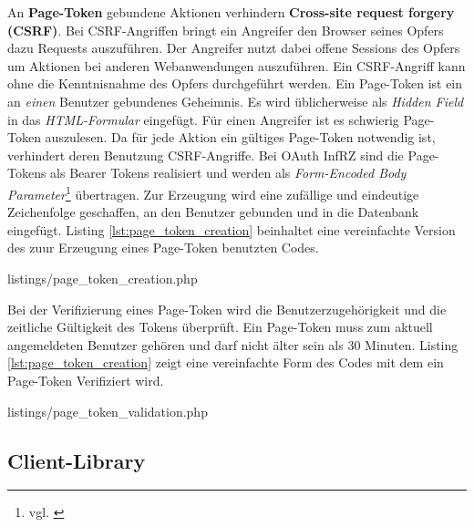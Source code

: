 \documentclass[12pt,a4paper,pointednumbers,abstracton]{scrartcl}
\begin{document}
An \textbf{Page-Token} gebundene Aktionen verhindern \textbf{Cross-site request forgery (CSRF)}.
Bei CSRF-Angriffen bringt ein Angreifer den Browser seines Opfers dazu Requests auszuführen.
Der Angreifer nutzt dabei offene Sessions des Opfers um Aktionen bei anderen Webanwendungen auszuführen.
Ein CSRF-Angriff kann ohne die Kenntnisnahme des Opfers durchgeführt werden.
Ein Page-Token ist ein an \emph{einen} Benutzer gebundenes Geheimnis.
Es wird üblicherweise als \emph{Hidden Field} in das \emph{HTML-Formular} eingefügt.
Für einen Angreifer ist es schwierig Page-Token auszulesen.
Da für jede Aktion ein gültiges Page-Token notwendig ist, verhindert deren Benutzung CSRF-Angriffe.
Bei OAuth InfRZ sind die Page-Tokens als Bearer Tokens realisiert und werden als \emph{Form-Encoded Body Parameter}\footnote{vgl. \cite[Section 2.2]{RFC6750}} übertragen.
Zur Erzeugung wird eine zufällige und eindeutige Zeichenfolge geschaffen, an den Benutzer gebunden und in die Datenbank eingefügt.
Listing \ref{lst:page_token_creation} beinhaltet eine vereinfachte Version des zuur Erzeugung eines Page-Token benutzten Codes.

\begin{minipage}{\textwidth}
	
	{listings/page_token_creation.php}
\end{minipage} 

Bei der Verifizierung eines Page-Token wird die Benutzerzugehörigkeit und die zeitliche Gültigkeit des Tokens überprüft.
Ein Page-Token muss zum aktuell angemeldeten Benutzer gehören und darf nicht älter sein als 30 Minuten.
Listing \ref{lst:page_token_creation} zeigt eine vereinfachte Form des Codes mit dem ein Page-Token Verifiziert wird.

\begin{minipage}{\textwidth}
	
	{listings/page_token_validation.php}
\end{minipage}


\subsection{Client-Library}
\label{sec:oauth-infrz/client}
\end{document}
